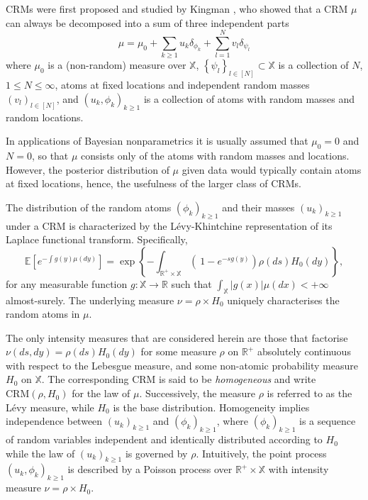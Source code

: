 \gls{CRM}s were first proposed and studied by Kingman \cite{Kingman:1967kn}, who showed that a \gls{CRM} $\mu$ can always be decomposed into a sum of three independent parts
$$ \mu = \mu_0 + \sum_{k \ge 1}{u_k \delta_{\phi_k}} + \sum_{l=1}^N{v_l \delta_{\psi_l}} $$
where $\mu_0$ is a (non-random) measure over $\mathbb{X}$, $\left\{ \psi_l \right\}_{l \in [N]} \subset  \mathbb{X}$ is a collection of $N$, $1 \le N \le \infty$, atoms at fixed locations and independent random masses $\left(v_l \right)_{l \in [N]}$, and $\left( u_k, \phi_k \right)_{k \ge 1}$ is a collection of atoms with random masses and random locations.

In applications of Bayesian nonparametrics it is usually assumed that $\mu_0 = 0$ and $N = 0$, so that $\mu$ consists only of the atoms with random masses and locations. However, the posterior distribution of $\mu$ given data would typically contain atoms at fixed locations, hence, the usefulness of the larger class of \gls{CRM}s.

The distribution of the random atoms $\left(\phi_k \right)_{k \ge 1}$ and their masses $\left(u_k \right)_{k \ge 1}$ under a \gls{CRM} is characterized by the Lévy-Khintchine representation of its Laplace functional transform. Specifically,
\begin{equation} \label{eq:levy}
\mathbb{E} \left[e^{-\int g(y)\mu(dy)} \right] = \exp \left\{ - \int_{\mathbb{R}^+ \times \mathbb{X}} \left( \  1 - e^{-sg(y)} \right) \rho(ds) H_0(dy) \right\},
\end{equation}
for any measurable function $g: \mathbb{X} \rightarrow \mathbb{R}$ such that $\int_{\mathbb{X}}|g(x)|\mu(dx)<+ \infty$ almost-surely.
The underlying measure $\nu = \rho \times H_0$ uniquely characterises the random atoms in $\mu$.

The only intensity measures that are considered herein are those that factorise $\nu(ds, dy) = \rho(ds)H_0(dy)$ for some measure $\rho$ on $\mathbb{R}^+$ absolutely continuous with respect to the Lebesgue measure, and some non-atomic probability measure $H_0$ on $\mathbb{X}$. The corresponding \gls{CRM} is said to be \textit{homogeneous} and write $\text{CRM}(\rho, H_0)$ for the law of $\mu$. Successively, the measure $\rho$ is referred to as the Lévy measure, while $H_0$ is the base distribution.
Homogeneity implies independence between $\left(u_k \right)_{k\ge1}$ and $\left(\phi_k \right)_{k\ge1}$, where $\left(\phi_k \right)_{k\ge1}$ is a sequence of random variables independent and identically distributed according to $H_0$ while the law of $\left(u_k \right)_{k\ge1}$  is governed by $\rho$. Intuitively, the point process $\left(u_k, \phi_k \right)_{k\ge1}$  is described by a Poisson process over $\mathbb{R}^+ \times \mathbb{X}$ with intensity measure $\nu = \rho \times H_0$.

